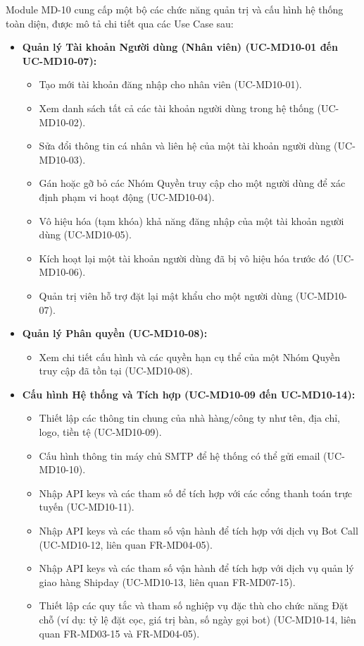 \label{sssec:md10_key_functionalities_full}
Module MD-10 cung cấp một bộ các chức năng quản trị và cấu hình hệ thống toàn diện, được mô tả chi tiết qua các Use Case sau:

\begin{itemize}
    \item \textbf{Quản lý Tài khoản Người dùng (Nhân viên) (UC-MD10-01 đến UC-MD10-07):}
    \begin{itemize}
        \item Tạo mới tài khoản đăng nhập cho nhân viên (UC-MD10-01).
        \item Xem danh sách tất cả các tài khoản người dùng trong hệ thống (UC-MD10-02).
        \item Sửa đổi thông tin cá nhân và liên hệ của một tài khoản người dùng (UC-MD10-03).
        \item Gán hoặc gỡ bỏ các Nhóm Quyền truy cập cho một người dùng để xác định phạm vi hoạt động (UC-MD10-04).
        \item Vô hiệu hóa (tạm khóa) khả năng đăng nhập của một tài khoản người dùng (UC-MD10-05).
        \item Kích hoạt lại một tài khoản người dùng đã bị vô hiệu hóa trước đó (UC-MD10-06).
        \item Quản trị viên hỗ trợ đặt lại mật khẩu cho một người dùng (UC-MD10-07).
    \end{itemize}

    \item \textbf{Quản lý Phân quyền (UC-MD10-08):}
    \begin{itemize}
        \item Xem chi tiết cấu hình và các quyền hạn cụ thể của một Nhóm Quyền truy cập đã tồn tại (UC-MD10-08).
    \end{itemize}

    \item \textbf{Cấu hình Hệ thống và Tích hợp (UC-MD10-09 đến UC-MD10-14):}
    \begin{itemize}
        \item Thiết lập các thông tin chung của nhà hàng/công ty như tên, địa chỉ, logo, tiền tệ (UC-MD10-09).
        \item Cấu hình thông tin máy chủ SMTP để hệ thống có thể gửi email (UC-MD10-10).
        \item Nhập API keys và các tham số để tích hợp với các cổng thanh toán trực tuyến (UC-MD10-11).
        \item Nhập API keys và các tham số vận hành để tích hợp với dịch vụ Bot Call (UC-MD10-12, liên quan FR-MD04-05).
        \item Nhập API keys và các tham số vận hành để tích hợp với dịch vụ quản lý giao hàng Shipday (UC-MD10-13, liên quan FR-MD07-15).
        \item Thiết lập các quy tắc và tham số nghiệp vụ đặc thù cho chức năng Đặt chỗ (ví dụ: tỷ lệ đặt cọc, giá trị bàn, số ngày gọi bot) (UC-MD10-14, liên quan FR-MD03-15 và FR-MD04-05).
    \end{itemize}


\end{itemize}
